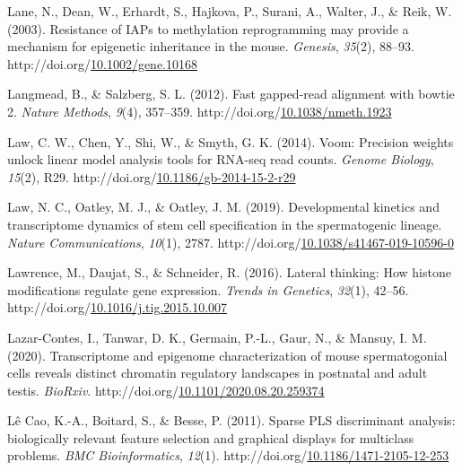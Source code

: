 \documentclass[12pt,twoside]{reedthesis}
\newlength{\cslhangindent}
\newenvironment{CSLReferences}[2] %
 {%
  \setlength{\parindent}{0pt}
  \ifodd #1 \everypar{\setlength{\hangindent}{\cslhangindent}}\ignorespaces\fi
  \ifnum #2 > 0
  \setlength{\parskip}{#2\baselineskip}
  \fi
 }%
 {}
\begin{document}
\begin{CSLReferences}{1}{0}
\leavevmode{}%
Lane, N., Dean, W., Erhardt, S., Hajkova, P., Surani, A., Walter, J., \& Reik, W. (2003). Resistance of IAPs to methylation reprogramming may provide a mechanism for epigenetic inheritance in the mouse. \emph{Genesis}, \emph{35}(2), 88--93. http://doi.org/\href{https://doi.org/10.1002/gene.10168}{10.1002/gene.10168}

\leavevmode{}%
Langmead, B., \& Salzberg, S. L. (2012). Fast gapped-read alignment with bowtie 2. \emph{Nature Methods}, \emph{9}(4), 357--359. http://doi.org/\href{https://doi.org/10.1038/nmeth.1923}{10.1038/nmeth.1923}

\leavevmode{}%
Law, C. W., Chen, Y., Shi, W., \& Smyth, G. K. (2014). Voom: Precision weights unlock linear model analysis tools for RNA-seq read counts. \emph{Genome Biology}, \emph{15}(2), R29. http://doi.org/\href{https://doi.org/10.1186/gb-2014-15-2-r29}{10.1186/gb-2014-15-2-r29}

\leavevmode{}%
Law, N. C., Oatley, M. J., \& Oatley, J. M. (2019). Developmental kinetics and transcriptome dynamics of stem cell specification in the spermatogenic lineage. \emph{Nature Communications}, \emph{10}(1), 2787. http://doi.org/\href{https://doi.org/10.1038/s41467-019-10596-0}{10.1038/s41467-019-10596-0}

\leavevmode{}%
Lawrence, M., Daujat, S., \& Schneider, R. (2016). Lateral thinking: How histone modifications regulate gene expression. \emph{Trends in Genetics}, \emph{32}(1), 42--56. http://doi.org/\href{https://doi.org/10.1016/j.tig.2015.10.007}{10.1016/j.tig.2015.10.007}

\leavevmode{}%
Lazar-Contes, I., Tanwar, D. K., Germain, P.-L., Gaur, N., \& Mansuy, I. M. (2020). Transcriptome and epigenome characterization of mouse spermatogonial cells reveals distinct chromatin regulatory landscapes in postnatal and adult testis. \emph{BioRxiv}. http://doi.org/\href{https://doi.org/10.1101/2020.08.20.259374}{10.1101/2020.08.20.259374}

\leavevmode{}%
Lê Cao, K.-A., Boitard, S., \& Besse, P. (2011). Sparse PLS discriminant analysis: biologically relevant feature selection and graphical displays for multiclass problems. \emph{BMC Bioinformatics}, \emph{12}(1). http://doi.org/\href{https://doi.org/10.1186/1471-2105-12-253}{10.1186/1471-2105-12-253}


\end{CSLReferences}
\end{document}

